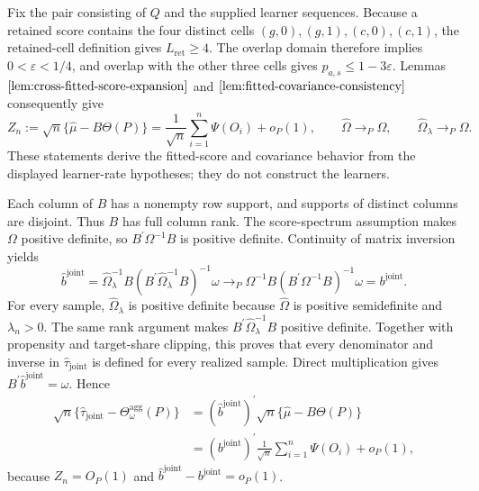 Fix the pair consisting of \(Q\) and the supplied learner sequences. Because a retained score contains the four distinct cells \((g,0),(g,1),(c,0),(c,1)\), the retained-cell definition gives \(L_{\mathrm{ret}}\ge4\). The overlap domain therefore implies \(0<\varepsilon<1/4\), and overlap with the other three cells gives \(p_{a,s}\le1-3\varepsilon\). Lemmas \(\ref{lem:cross-fitted-score-expansion}\) and \(\ref{lem:fitted-covariance-consistency}\) consequently give
\[
 Z_n:=\sqrt n\{\widehat\mu-B\Theta(P)\}
 =\frac1{\sqrt n}\sum_{i=1}^n\Psi(O_i)+o_P(1),
 \qquad
 \widehat\Omega\to_P\Omega,
 \qquad
 \widehat\Omega_\lambda\to_P\Omega.
\]
These statements derive the fitted-score and covariance behavior from the displayed learner-rate hypotheses; they do not construct the learners.

Each column of \(B\) has a nonempty row support, and supports of distinct columns are disjoint. Thus \(B\) has full column rank. The score-spectrum assumption makes \(\Omega\) positive definite, so \(B^{\prime}\Omega^{-1}B\) is positive definite. Continuity of matrix inversion yields
\[
 \widehat b^{\mathrm{joint}}
 =\widehat\Omega_\lambda^{-1}B
 (B^{\prime}\widehat\Omega_\lambda^{-1}B)^{-1}\omega
 \to_P
 \Omega^{-1}B(B^{\prime}\Omega^{-1}B)^{-1}\omega
 =b^{\mathrm{joint}}.
\]
For every sample, \(\widehat\Omega_\lambda\) is positive definite because \(\widehat\Omega\) is positive semidefinite and \(\lambda_n>0\). The same rank argument makes \(B^{\prime}\widehat\Omega_\lambda^{-1}B\) positive definite. Together with propensity and target-share clipping, this proves that every denominator and inverse in \(\widehat\tau_{\mathrm{joint}}\) is defined for every realized sample. Direct multiplication gives \(B^{\prime}\widehat b^{\mathrm{joint}}=\omega\). Hence
\[
\begin{aligned}
 \sqrt n\{\widehat\tau_{\mathrm{joint}}-
 \Theta_\omega^{\mathrm{agg}}(P)\}
 &=(\widehat b^{\mathrm{joint}})^{\prime}
 \sqrt n\{\widehat\mu-B\Theta(P)\}\\
 &=(b^{\mathrm{joint}})^{\prime}\frac1{\sqrt n}
 \sum_{i=1}^n\Psi(O_i)+o_P(1),
\end{aligned}
\]
because \(Z_n=O_P(1)\) and \(\widehat b^{\mathrm{joint}}-b^{\mathrm{joint}}=o_P(1)\).

